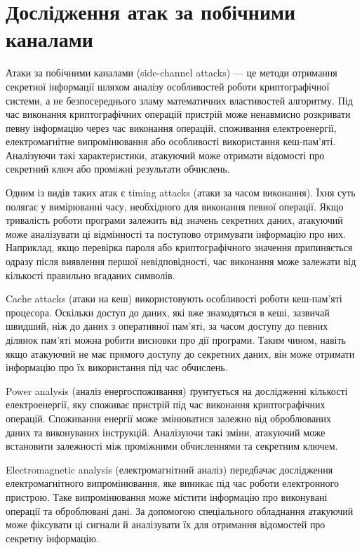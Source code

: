 \section{Дослідження атак за побічними каналами}

Атаки за побічними каналами (side-channel attacks) — це методи отримання секретної інформації 
шляхом аналізу особливостей роботи криптографічної системи, а не безпосереднього зламу математичних 
властивостей алгоритму. Під час виконання криптографічних операцій пристрій може ненавмисно розкривати 
певну інформацію через час виконання операцій, споживання електроенергії, електромагнітне випромінювання 
або особливості використання кеш-пам'яті. Аналізуючи такі характеристики, атакуючий може отримати відомості 
про секретний ключ або проміжні результати обчислень.

Одним із видів таких атак є timing attacks (атаки за часом виконання). Їхня суть полягає у вимірюванні часу, 
необхідного для виконання певної операції. Якщо тривалість роботи програми залежить від значень секретних даних, 
атакуючий може аналізувати ці відмінності та поступово отримувати інформацію про них. Наприклад, якщо перевірка 
пароля або криптографічного значення припиняється одразу після виявлення першої невідповідності, час виконання 
може залежати від кількості правильно вгаданих символів.

Cache attacks (атаки на кеш) використовують особливості роботи кеш-пам'яті процесора. Оскільки доступ до даних, 
які вже знаходяться в кеші, зазвичай швидший, ніж до даних з оперативної пам'яті, за часом доступу до певних ділянок пам'яті 
можна робити висновки про дії програми. Таким чином, навіть якщо атакуючий не має прямого доступу до секретних даних, 
він може отримати інформацію про їх використання під час обчислень.

Power analysis (аналіз енергоспоживання) ґрунтується на дослідженні кількості електроенергії, яку споживає пристрій 
під час виконання криптографічних операцій. Споживання енергії може змінюватися залежно від оброблюваних даних та 
виконуваних інструкцій. Аналізуючи такі зміни, атакуючий може встановити залежності між проміжними обчисленнями та секретним ключем.

Electromagnetic analysis (електромагнітний аналіз) передбачає дослідження електромагнітного випромінювання, яке виникає 
під час роботи електронного пристрою. Таке випромінювання може містити інформацію про виконувані операції та оброблювані дані. 
За допомогою спеціального обладнання атакуючий може фіксувати ці сигнали й аналізувати їх для отримання відомостей про секретну інформацію.

